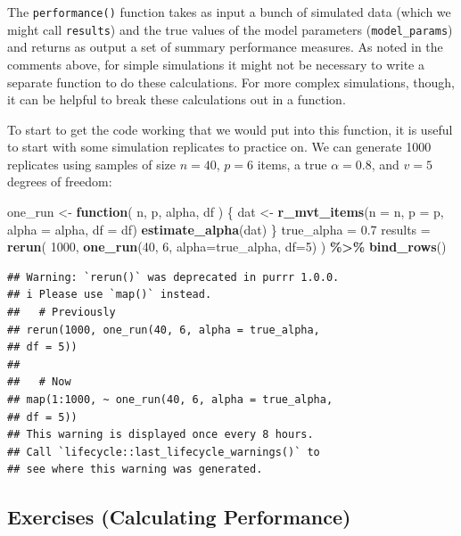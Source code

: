 \documentclass[
]{book}
\newenvironment{Shaded}{\begin{snugshade}}{\end{snugshade}}
\newcommand{\AttributeTok}[1]{\textcolor[rgb]{0.13,0.29,0.53}{#1}}
\newcommand{\ControlFlowTok}[1]{\textcolor[rgb]{0.13,0.29,0.53}{\textbf{#1}}}
\newcommand{\DecValTok}[1]{\textcolor[rgb]{0.00,0.00,0.81}{#1}}
\newcommand{\FloatTok}[1]{\textcolor[rgb]{0.00,0.00,0.81}{#1}}
\newcommand{\FunctionTok}[1]{\textcolor[rgb]{0.13,0.29,0.53}{\textbf{#1}}}
\newcommand{\NormalTok}[1]{#1}
\newcommand{\OtherTok}[1]{\textcolor[rgb]{0.56,0.35,0.01}{#1}}
\newcommand{\SpecialCharTok}[1]{\textcolor[rgb]{0.81,0.36,0.00}{\textbf{#1}}}
\begin{document}
The \texttt{performance()} function takes as input a bunch of simulated data (which we might call \texttt{results}) and the true values of the model parameters (\texttt{model\_params}) and returns as output a set of summary performance measures. As noted in the comments above, for simple simulations it might not be necessary to write a separate function to do these calculations. For more complex simulations, though, it can be helpful to break these calculations out in a function.

To start to get the code working that we would put into this function, it is useful to start with some simulation replicates to practice on.
We can generate 1000 replicates using samples of size \(n = 40\), \(p = 6\) items, a true \(\alpha = 0.8\), and \(v = 5\) degrees of freedom:

\begin{Shaded}
\begin{Highlighting}[]
\NormalTok{one\_run }\OtherTok{\textless{}{-}} \ControlFlowTok{function}\NormalTok{( n, p, alpha, df ) \{}
\NormalTok{    dat }\OtherTok{\textless{}{-}} \FunctionTok{r\_mvt\_items}\NormalTok{(}\AttributeTok{n =}\NormalTok{ n, }\AttributeTok{p =}\NormalTok{ p, }\AttributeTok{alpha =}\NormalTok{ alpha, }\AttributeTok{df =}\NormalTok{ df)}
    \FunctionTok{estimate\_alpha}\NormalTok{(dat)}
\NormalTok{\}}
\NormalTok{true\_alpha }\OtherTok{=} \FloatTok{0.7}
\NormalTok{results }\OtherTok{=} \FunctionTok{rerun}\NormalTok{( }\DecValTok{1000}\NormalTok{, }\FunctionTok{one\_run}\NormalTok{(}\DecValTok{40}\NormalTok{, }\DecValTok{6}\NormalTok{, }\AttributeTok{alpha=}\NormalTok{true\_alpha, }\AttributeTok{df=}\DecValTok{5}\NormalTok{) ) }\SpecialCharTok{\%\textgreater{}\%}
  \FunctionTok{bind\_rows}\NormalTok{()}
\end{Highlighting}
\end{Shaded}

\begin{verbatim}
## Warning: `rerun()` was deprecated in purrr 1.0.0.
## i Please use `map()` instead.
##   # Previously
## rerun(1000, one_run(40, 6, alpha = true_alpha,
## df = 5))
## 
##   # Now
## map(1:1000, ~ one_run(40, 6, alpha = true_alpha,
## df = 5))
## This warning is displayed once every 8 hours.
## Call `lifecycle::last_lifecycle_warnings()` to
## see where this warning was generated.
\end{verbatim}

\subsection{Exercises (Calculating Performance)}\label{exercises-calculating-performance}
\end{document}
